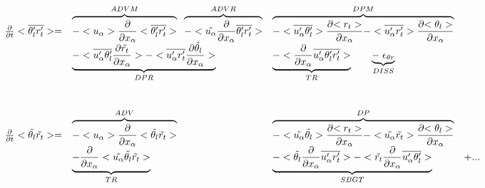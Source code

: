 \begin{displaymath}
\left.
\begin{array}{rllll}
\frac{\partial }{\partial t} <\overline{\theta_l'r_t'}> = & 
\overbrace{- <u_\alpha>\frac{\partial}{\partial x_\alpha} <\overline{\theta_l'r_t'}> }^{ADVM} \;\;
\overbrace{- <\tilde{u_\alpha}\frac{\partial}{\partial x_\alpha} \overline{\theta_l'r_t'} > }^{ADVR} &
\overbrace{- <\overline{u_\alpha'\theta_l'}> \frac{\partial {<r_t>}}{\partial x_\alpha}
- <\overline{u'_\alpha r_t'}> \frac{\partial {<\theta_l>}}{\partial x_\alpha}}^{DPM} \\
\vspace*{1.0cm}
& \underbrace{- <\overline{u'_\alpha \theta_l'} \frac{\partial {\tilde{r_t}}}{\partial x_\alpha}>
- <\overline{u'_\alpha r_t'} \frac{\partial {\tilde{\theta_l}}}{\partial x_\alpha}>}_{DPR} 
 & \underbrace{- <\frac{\partial}{\partial x_\alpha} \overline{u'_\alpha \theta_l'r_t'}>}_{TR} \;\;\;\;\;\;\;
 \underbrace{-\; \epsilon_{\theta r}}_{DISS}\\
 \frac{\partial }{\partial t} <\tilde{\theta_l}\tilde{r_t}> = & 
\overbrace{- <u_\alpha>\frac{\partial}{\partial x_\alpha} <\tilde{\theta_l}\tilde{r_t}> }^{ADV} &
\overbrace{- <\tilde{u_\alpha} \tilde{\theta_l}> \frac{\partial {<r_t>}}{\partial x_\alpha}
- <\tilde{u_\alpha} \tilde{r_t}> \frac{\partial {<\theta_l>}}{\partial x_\alpha}}^{DP} &\\
 & \underbrace{- \frac{\partial}{\partial x_\alpha} <\tilde{u_\alpha} \tilde{\theta_l}\tilde{r_t}>}_{TR} &
\underbrace{- <\tilde{\theta_l}\frac{\partial}{\partial x_\alpha}\overline{u'_\alpha r_t'}>
- <\tilde{r_t}\frac{\partial}{\partial x_\alpha}\overline{u'_\alpha \theta_l'}>}_{SBGT} & + ...
\end{array}
\right.
\end{displaymath}

